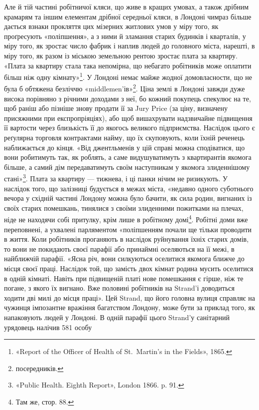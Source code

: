 Але й тій частині робітничої кляси, що живе в кращих умовах,
а також дрібним крамарям та іншим елементам дрібної
середньої кляси, в Лондоні чимраз більше дається взнаки прокляття
цих мізерних житлових умов у міру того, як проґресують
«поліпшення», а з ними й зламання старих будинків і кварталів,
у міру того, як зростає число фабрик і наплив людей до головного
міста, нарешті, в міру того, як разом із міською земельною
рентою зростає плата за квартиру. «Плата за квартиру стала
така непомірна, що небагато робітників може оплатити більш
ніж одну кімнату»\footnote{
«Report of the Officer of Health of St.~Martin’s in the Fields», 1865.
}. У Лондоні немає майже жодної домовласности,
що не була б обтяжена безліччю «middlemen’ів»\footnote*{
посередників. 
}. Ціна
землі в Лондоні завжди дуже висока порівняно з річними доходами
з неї, бо кожний покупець спекулює на те, щоб раніш або
пізніше знову продати її за Jury Price (за ціну, визначену присяжними
при експропріяціях), або щоб вишахрувати надзвичайне
підвищення її вартости через близькість її до якогось великого
підприємства. Наслідок цього є реґулярна торговля контрактами
найму, що їх скуповують, коли їхній реченець наближається
до кінця. «Від джентльменів у цій справі можна сподіватися, що
вони робитимуть так, як роблять, а саме видушуватимуть з
квартирантів якомога більше, а самий дім передаватимуть своїм
наступникам у якомога злиденнішому стані»\footnote{
«Public Health. Eighth Report», London 1866. p. 91.
}. Плата за квартиру
— тижнева, і ці панки нічим не ризикують. У наслідок
того, що залізниці будується в межах міста, «недавно одного
суботнього вечора у східній частині Лондону можна було бачити,
як сила родин, вигнаних із своїх старих помешкань, тинялися
з своїми злиденними пожитками на плечах, ніде не находячи
собі притулку, крім лише в робітному домі\footnote{
Там же, стор. 88.
}. Робітні
доми вже переповнені, а ухвалені парляментом «поліпшенням
почали ще тільки проводити в життя. Коли робітників проганяють
в наслідок руйнування їхніх старих домів, то вони не покидають
своєї парафії або принаймні оселяються на її межі, в найближчій
парафії. «Ясна річ, вони силкуються оселитися якомога
ближче до місця своєї праці. Наслідок той, що замість двох кімнат
родина мусить оселитися в одній кімнаті. Навіть при підвищеній
платі нове помешкання є гірше, ніж те погане, з якого їх вигнано.
Вже половині робітників на Strand’і доводиться ходити дві милі
до місця праці». Цей Strand, що його головна вулиця справляє
на чужинця імпозантне вражіння багатством Лондону, може
бути за приклад того, як напаковують людей у Лондоні. В одній
парафії цього Strand’у санітарний урядовець налічив 581 особу
\parbreak{}  %
